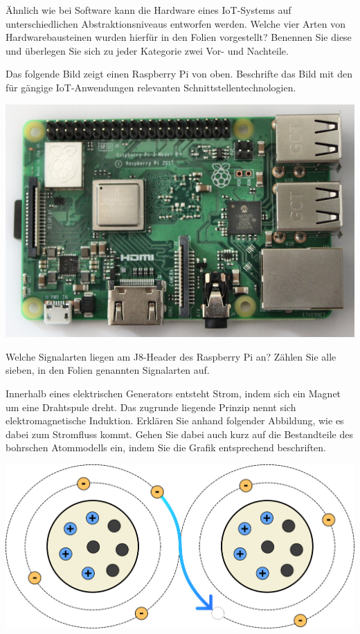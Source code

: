 \AufgabenHeader

\teilaufgabe
Ähnlich wie bei Software kann die Hardware eines IoT-Systems auf unterschiedlichen
Abstraktionsniveaus entworfen werden. Welche vier Arten von Hardwarebausteinen
wurden hierfür in den Folien vorgestellt? Benennen Sie diese und überlegen Sie
sich zu jeder Kategorie zwei Vor- und Nachteile.

\bigskip
\teilaufgabe
Das folgende Bild zeigt einen Raspberry Pi von oben. Beschrifte das Bild mit den
für gängige IoT-Anwendungen relevanten Schnittstellentechnologien.

\begin{center}
    \includegraphics[width=.5\textwidth]{2-hardwaredesign/img/rasbperrypi_foto}
\end{center}

\bigskip
\teilaufgabe
Welche Signalarten liegen am J8-Header des Raspberry Pi an? Zählen Sie alle sieben,
in den Folien genannten Signalarten auf.


\teilaufgabe
Innerhalb eines elektrischen Generators entsteht Strom, indem sich ein Magnet um
eine Drahtspule dreht. Das zugrunde liegende Prinzip nennt sich elektromagnetische
Induktion. Erklären Sie anhand folgender Abbildung, wie es dabei zum Stromfluss
kommt. Gehen Sie dabei auch kurz auf die Bestandteile des bohrschen Atommodells
ein, indem Sie die Grafik entsprechend beschriften.

\begin{center}
    \includegraphics[width=.75\textwidth]{2-hardwaredesign/img/atom_elektronenfluss}
\end{center}

